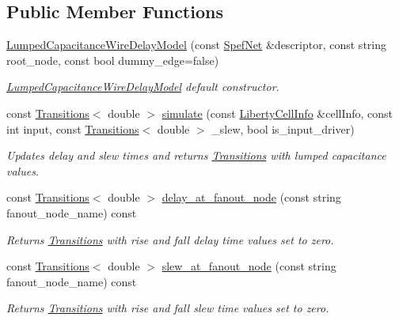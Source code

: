 \subsection*{Public Member Functions}
\begin{DoxyCompactItemize}
\item 
\hyperlink{classLumpedCapacitanceWireDelayModel_ae147cdba517e3f6152ed8234473e5443}{Lumped\-Capacitance\-Wire\-Delay\-Model} (const \hyperlink{configuration_8h_ab11dad9e61bc038c56517ca2735fb449}{Spef\-Net} \&descriptor, const string root\-\_\-node, const bool dummy\-\_\-edge=false)
\begin{DoxyCompactList}\small\item\em \hyperlink{classLumpedCapacitanceWireDelayModel}{Lumped\-Capacitance\-Wire\-Delay\-Model} default constructor. \end{DoxyCompactList}\item 
const \hyperlink{classTransitions}{Transitions}$<$ double $>$ \hyperlink{classLumpedCapacitanceWireDelayModel_a1bba0aef3bebe8df97a63e05b307b19a}{simulate} (const \hyperlink{structLibertyCellInfo}{Liberty\-Cell\-Info} \&cell\-Info, const int input, const \hyperlink{classTransitions}{Transitions}$<$ double $>$ \-\_\-slew, bool is\-\_\-input\-\_\-driver)
\begin{DoxyCompactList}\small\item\em Updates delay and slew times and returns \hyperlink{classTransitions}{Transitions} with lumped capacitance values. \end{DoxyCompactList}\item 
const \hyperlink{classTransitions}{Transitions}$<$ double $>$ \hyperlink{classLumpedCapacitanceWireDelayModel_a0266cb676908d95bdfcb64d1137898b0}{delay\-\_\-at\-\_\-fanout\-\_\-node} (const string fanout\-\_\-node\-\_\-name) const 
\begin{DoxyCompactList}\small\item\em Returns \hyperlink{classTransitions}{Transitions} with rise and fall delay time values set to zero. \end{DoxyCompactList}\item 
const \hyperlink{classTransitions}{Transitions}$<$ double $>$ \hyperlink{classLumpedCapacitanceWireDelayModel_aaedd69e811e7220e48493c51fb0443ed}{slew\-\_\-at\-\_\-fanout\-\_\-node} (const string fanout\-\_\-node\-\_\-name) const 
\begin{DoxyCompactList}\small\item\em Returns \hyperlink{classTransitions}{Transitions} with rise and fall slew time values set to zero. \end{DoxyCompactList}\item 

\end{DoxyCompactItemize}
